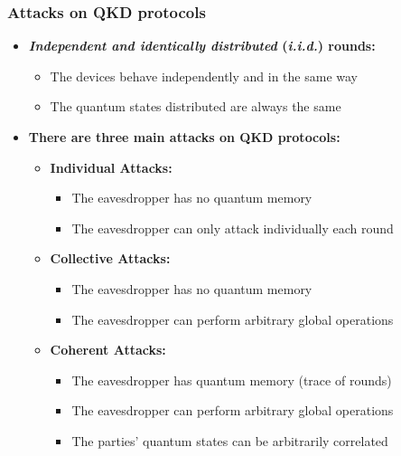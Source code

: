 \documentclass{beamer}
\begin{document}
		\begin{frame}
			\frametitle{\Large Attacks on QKD protocols}

            \vspace{4ex}
            \begin{itemize}
                \item \textbf{\textit{Independent and identically distributed} (\textit{i.i.d.}) rounds:}
                \vspace{-2.5ex}
                \begin{itemize}
                    \item The devices behave independently and in the same way
                    \item The quantum states distributed are always the same
                \end{itemize}
                \vspace{0.5ex}
                \item \textbf{There are three main attacks on QKD protocols:}
                \begin{itemize}
                    \item \textbf{Individual Attacks:}
                    \begin{itemize}
                        \footnotesize
                        \item The eavesdropper has no quantum memory\\
                        \footnotesize
                        \item The eavesdropper can only attack individually each round
                    \end{itemize}
                    \item \textbf{Collective Attacks:}
                    \begin{itemize}
                        \footnotesize
                        \item The eavesdropper has no quantum memory\\
                        \footnotesize
                        \item The eavesdropper can perform arbitrary global operations
                    \end{itemize}
                    \item \textbf{Coherent Attacks:}
                    \begin{itemize}
                        \footnotesize
                        \item The eavesdropper has quantum memory (trace of rounds)\\
                        \footnotesize
                        \item The eavesdropper can perform arbitrary global operations\\
                        \footnotesize
                        \item The parties' quantum states can be arbitrarily correlated
                    \end{itemize}
                \end{itemize}
            \end{itemize}
   

\end{frame}
\end{document}
